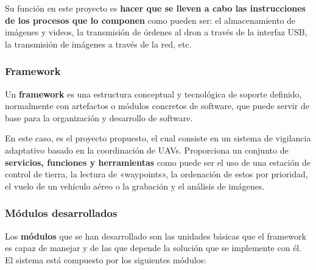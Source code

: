 Su función en este proyecto es \textbf{hacer que se lleven a cabo las instrucciones de los procesos que lo componen} como pueden ser: el almacenamiento de imágenes y videos, la transmisión de órdenes al dron a través de la interfaz USB, la transmisión de imágenes a través de la red, etc.

\subsubsection{Framework}
\label{sec:framework}

Un \textbf{framework} es una estructura conceptual y tecnológica de soporte definido, normalmente con artefactos o módulos concretos de software, que puede servir de base para la organización y desarrollo de software.

En este caso, es el proyecto propuesto, el cual consiste en un sistema de vigilancia adaptativo basado en la coordinación de \acs{UAV}s. Proporciona un conjunto de \textbf{servicios, funciones y herramientas} como puede ser el uso de una estación de control de tierra, la lectura de «waypoints», la ordenación de estos por prioridad, el vuelo de un vehículo aéreo o la grabación y el análisis de imágenes.

\subsubsection{Módulos desarrollados}
\label{sec:modulos}

Los \textbf{módulos} que se han desarrollado son las unidades básicas que el framework es capaz de manejar y de las que depende la solución que se implemente con él. El sistema está compuesto por los siguientes módulos:

